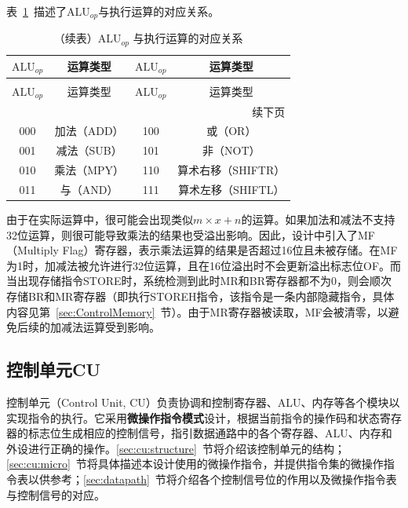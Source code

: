 \documentclass[lang=cn,a4paper,newtx]{elegantpaper}
\begin{document}
表~\ref{tab:aluop}~描述了$\text{ALU}_{op}$与执行运算的对应关系。
\begin{longtable}{c c @{\hskip 2cm} c c}
  \caption{$\text{ALU}_{op}$ 与执行运算的对应关系} \label{tab:aluop} \\
  \toprule
  $\text{ALU}_{op}$ & 运算类型 & $\text{ALU}_{op}$ & 运算类型 \\
  \midrule
  \endfirsthead

  \caption[]{（续表）$\text{ALU}_{op}$ 与执行运算的对应关系} \\
  \toprule
  $\text{ALU}_{op}$ & 运算类型 & $\text{ALU}_{op}$ & 运算类型 \\
  \midrule
  \endhead

  \midrule
  \multicolumn{4}{r}{续下页} \\
  \midrule
  \endfoot

  \bottomrule
  \endlastfoot

  000 & 加法（ADD）       & 100 & 或（OR）         \\
  001 & 减法（SUB）       & 101 & 非（NOT）        \\
  010 & 乘法（MPY）       & 110 & 算术右移（SHIFTR）   \\
  011 & 与（AND）         & 111 & 算术左移（SHIFTL）   \\

\end{longtable}

由于在实际运算中，很可能会出现类似$m\times x +n$的运算。如果加法和减法不支持32位运算，则很可能导致乘法的结果也受溢出影响。因此，设计中引入了MF（Multiply Flag）寄存器，表示乘法运算的结果是否超过16位且未被存储。在MF为1时，加减法被允许进行32位运算，且在16位溢出时不会更新溢出标志位OF。而当出现存储指令STORE时，系统检测到此时MR和BR寄存器都不为0，则会顺次存储BR和MR寄存器（即执行STOREH指令，该指令是一条内部隐藏指令，具体内容见第~\ref{sec:ControlMemory}~节）。由于MR寄存器被读取，MF会被清零，以避免后续的加减法运算受到影响。

\subsection{控制单元CU}
控制单元（Control Unit, CU）负责协调和控制寄存器、ALU、内存等各个模块以实现指令的执行。它采用\textbf{微操作指令模式}设计，根据当前指令的操作码和状态寄存器的标志位生成相应的控制信号，指引数据通路中的各个寄存器、ALU、内存和外设进行正确的操作。\ref{sec:cu:structure}~节将介绍该控制单元的结构；\ref{sec:cu:micro}~节将具体描述本设计使用的微操作指令，并提供指令集的微操作指令表以供参考；\ref{sec:datapath}~节将介绍各个控制信号位的作用以及微操作指令表与控制信号的对应。
\end{document}
